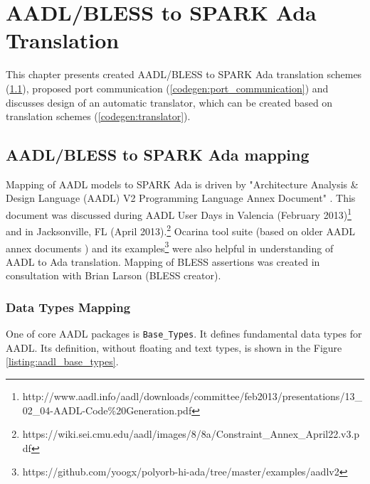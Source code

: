 
\cleardoublepage


\chapter{AADL/BLESS to SPARK Ada Translation}
\label{codegen}

This chapter presents created AADL/BLESS to SPARK Ada translation schemes (\ref{codegen:mapping}), proposed port communication (\ref{codegen:port_communication}) and discusses design of an automatic translator, which can be created based on translation schemes (\ref{codegen:translator}).



\section{AADL/BLESS to SPARK Ada mapping}
\label{codegen:mapping}


Mapping of AADL models to SPARK Ada is driven by "Architecture Analysis \& Design Language (AADL) V2 Programming Language Annex Document" \cite{AnnexDoc}. This document was discussed during AADL User Days in Valencia (February 2013)\footnote{http://www.aadl.info/aadl/downloads/committee/feb2013/presentations/13\_02\_04-AADL-Code\%20Generation.pdf} and in Jacksonville, FL (April 2013).\footnote{https://wiki.sei.cmu.edu/aadl/images/8/8a/Constraint\_Annex\_April22.v3.pdf} Ocarina tool suite (based on older AADL annex documents \cite{Ocarina:Article}) and its examples\footnote{https://github.com/yoogx/polyorb-hi-ada/tree/master/examples/aadlv2} were also helpful in understanding of AADL to Ada translation. Mapping of BLESS assertions was created in consultation with Brian Larson (BLESS creator).
 


\subsection{Data Types Mapping}
\label{codegen:mapping:data}

One of core AADL packages is \lstinline{Base_Types}. It defines fundamental data types for AADL. Its definition, without floating and text types, is shown in the Figure \ref{listing:aadl_base_types}.

